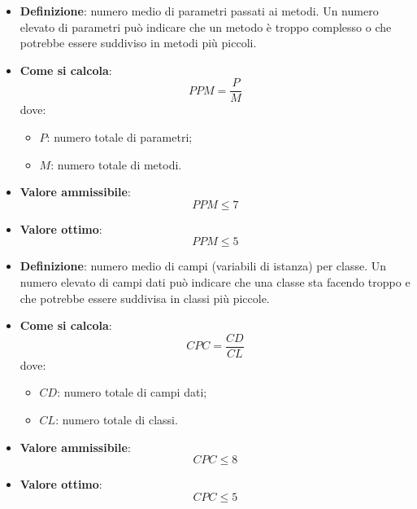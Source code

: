 \begin{itemize}
	\item \textbf{Definizione}: numero medio di parametri passati ai metodi. Un numero elevato di parametri può indicare che un metodo è troppo complesso o che potrebbe essere suddiviso in metodi più piccoli.
	\item \textbf{Come si calcola}: \begin{equation*}PPM = \frac{P}{M}\end{equation*} dove:
		\begin{itemize}
			\item $P$: numero totale di parametri;
			\item $M$: numero totale di metodi.
		\end{itemize}
	\item \textbf{Valore ammissibile}: \begin{equation*}PPM \leq 7\end{equation*}
	\item \textbf{Valore ottimo}: \begin{equation*}PPM \leq 5\end{equation*}
\end{itemize}

\begin{itemize}
	\item \textbf{Definizione}: numero medio di campi (variabili di istanza) per classe. Un numero elevato di campi dati può indicare che una classe sta facendo troppo e che potrebbe essere suddivisa in classi più piccole.
	\item \textbf{Come si calcola}: \begin{equation*}CPC = \frac{CD}{CL}\end{equation*} dove:
		\begin{itemize}
			\item $CD$: numero totale di campi dati;
			\item $CL$: numero totale di classi.
		\end{itemize}
	\item \textbf{Valore ammissibile}: \begin{equation*}CPC \leq 8\end{equation*}
	\item \textbf{Valore ottimo}: \begin{equation*}CPC \leq 5\end{equation*}
\end{itemize}

